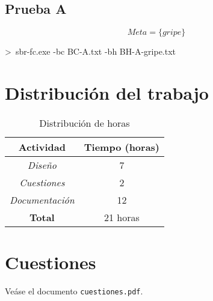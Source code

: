 \documentclass[a4paper,11pt, includehead]{article}
\begin{document}
\subsection{Prueba A}
$$Meta=\{gripe\}$$
\begin{center}
	\begin{tcolorbox}[simplecmd]
		>\ sbr-fc.exe -bc BC-A.txt -bh BH-A-gripe.txt
	\end{tcolorbox}
\end{center}
\noindent
\begin{center}
	\begin{minipage}[t]{0.55\textwidth}
		
	\end{minipage}%
\end{center}

\section{Distribución del trabajo}
\begin{table}[h!]
	\centering
	\renewcommand{\arraystretch}{1.20} %
	\begin{tabular}{|c|c|}
		\hline
		\textbf{Actividad} & \textbf{Tiempo (horas)}\\
		\hline
		\textit{Diseño} & 7 \\
		\hline
		\textit{Cuestiones} & 2 \\
		\hline
		\textit{Documentación} & 12 \\
		\hline
		\textbf{Total} & 21 horas \\
		\hline
	\end{tabular}
	\caption{Distribución de horas}
\end{table}

\section{Cuestiones}
\noindent Veáse el documento \texttt{cuestiones.pdf}.
\end{document}
